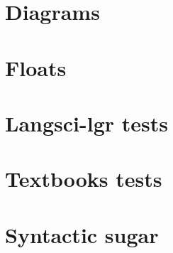 \documentclass[output=book
  ,nonflat
  ,modfonts,
  ,colorlinks
  ,showindex
  ,draftmode
  ,nobabel
  ,booklanguage=french
  ]{langsci/langscibook}
\begin{document}
\section{Diagrams}
 

\section{Floats}
 
%  
%  
%  
\section{Langsci-lgr tests}
 

%  

%  
% 
\section{Textbooks tests}
 
 
 

\section{Syntactic sugar}
 

\end{document}
